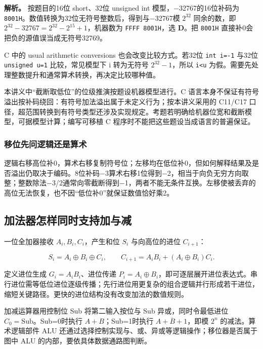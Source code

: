 
\textbf{解析。} 按题目的16位 short、32位 unsigned int 模型，−32767的16位补码为 \texttt{8001H}。数值转换为32位无符号整数后，得到与−32767模 \(2^{32}\) 同余的数，即 \(2^{32}-32767=2^{32}-2^{15}+1\)，机器数为 \texttt{FFFF\ 8001H}，选 \textbf{D}。把 \texttt{8001H} 直接补0会把负的源值误当成无符号32769。

C 中的 usual arithmetic conversions 也会改变比较方式。若32位 \texttt{int\ i=-1} 与32位 \texttt{unsigned\ u=1} 比较，常见模型下 i 转为无符号 \(2^{32}-1\)，所以 \texttt{i\textless{}u} 为假。需要先处理整数提升和通常算术转换，再决定比较哪种值。

本讲义中``截断取低位''的位级推演按题设机器模型进行。C 语言本身不保证有符号溢出按补码绕回：有符号加法溢出属于未定义行为；按本讲义采用的 C11/C17 口径，超范围转换到有符号类型还涉及实现规定。考题若明确给机器位宽和截断模型，可据模型计算；编写可移植 C 程序时不能把这些题设当成语言的普遍保证。

\subsubsection{移位先问逻辑还是算术}\label{ux79fbux4f4dux5148ux95eeux903bux8f91ux8fd8ux662fux7b97ux672f}

逻辑右移高位补0，算术右移复制符号位；左移均在低位补0，但如何解释结果及是否溢出仍取决于编码。8位补码−3算术右移1位得到−2，相当于向负无穷方向取整；整数除法−3/2通常向零截断得到−1，两者不能无条件互换。左移使被丢弃的高位无法恢复，也不因``低位补0''就保证数值恰好乘2。

\subsection{加法器怎样同时支持加与减}\label{co-02-04}

一位全加器接收 \(A_i,B_i,C_i\)，产生和位 \(S_i\) 与向高位的进位 \(C_{i+1}\)：

\[
S_i=A_i\oplus B_i\oplus C_i,
\qquad C_{i+1}=A_iB_i+(A_i\oplus B_i)C_i.
\]

定义进位生成 \(G_i=A_iB_i\)、进位传递 \(P_i=A_i\oplus B_i\)，即可逐层展开进位表达式。串行进位需等低位进位逐级传播；先行进位用更复杂的组合逻辑并行形成若干进位，缩短关键路径。更快的进位结构没有改变加法的数值规则。

加减运算器用控制位 Sub 将第二输入按位与 Sub 异或，同时令最低进位 \(C_0=\mathrm{Sub}\)。Sub=0时执行 \(A+B\)；Sub=1时执行 \(A+\overline B+1\)，即模 \(2^n\) 的减法。算术逻辑部件 ALU 还通过选择控制实现与、或、异或等逻辑操作；移位器是否属于图中 ALU 的内部，要依具体数据通路图判断。

